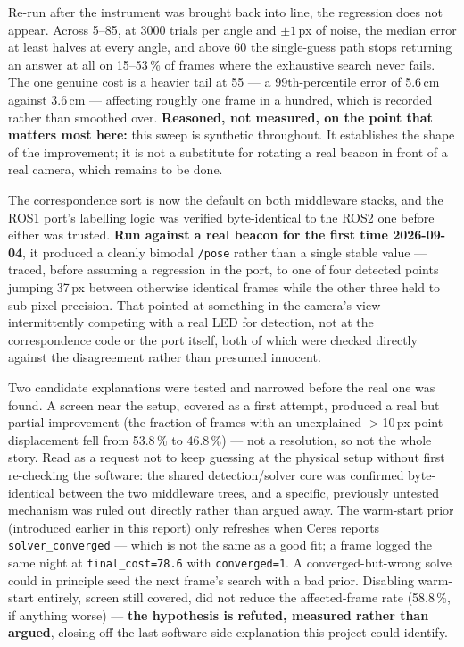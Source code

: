 \documentclass[11pt]{article}
\begin{document}
Re-run after the instrument was brought back into line, the regression does
not appear. Across 5--85\textdegree{}, at 3000 trials per angle and
$\pm1$\,px of noise, the median error at least halves at every angle, and
above 60\textdegree{} the single-guess path stops returning an answer at all
on 15--53\,\% of frames where the exhaustive search never fails. The one
genuine cost is a heavier tail at 55\textdegree{} --- a 99th-percentile
error of 5.6\,cm against 3.6\,cm --- affecting roughly one frame in a
hundred, which is recorded rather than smoothed over. \textbf{Reasoned, not
measured, on the point that matters most here:} this sweep is synthetic
throughout. It establishes the shape of the improvement; it is not a
substitute for rotating a real beacon in front of a real camera, which
remains to be done.

The correspondence sort is now the default on both middleware stacks, and
the ROS1 port's labelling logic was verified byte-identical to the ROS2
one before either was trusted. \textbf{Run against a real beacon for the
first time 2026-09-04}, it produced a cleanly bimodal \texttt{/pose} rather
than a single stable value --- traced, before assuming a regression in the
port, to one of four detected points jumping 37\,px between otherwise
identical frames while the other three held to sub-pixel precision. That
pointed at something in the camera's view intermittently competing with a
real LED for detection, not at the correspondence code or the port itself,
both of which were checked directly against the disagreement rather than
presumed innocent.

Two candidate explanations were tested and narrowed before the real one was
found. A screen near the setup, covered as a first attempt, produced a real
but partial improvement (the fraction of frames with an unexplained
$>$10\,px point displacement fell from 53.8\,\% to 46.8\,\%) --- not a
resolution, so not the whole story. Read as a request not to keep guessing
at the physical setup without first re-checking the software: the shared
detection/solver core was confirmed byte-identical between the two
middleware trees, and a specific, previously untested mechanism was ruled
out directly rather than argued away. The warm-start prior (introduced
earlier in this report) only refreshes when Ceres reports
\texttt{solver\_converged} --- which is not the same as a good fit; a
frame logged the same night at \texttt{final\_cost=78.6} with
\texttt{converged=1}. A converged-but-wrong solve could in principle seed
the next frame's search with a bad prior. Disabling warm-start entirely,
screen still covered, did not reduce the affected-frame rate (58.8\,\%, if
anything worse) --- \textbf{the hypothesis is refuted, measured rather than
argued}, closing off the last software-side explanation this project could
identify.
\end{document}
